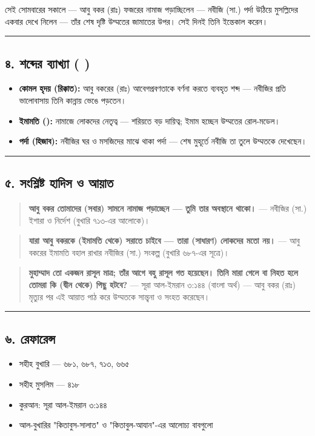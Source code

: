 সেই সোমবারের সকালে — আবু বকর (রাঃ) ফজরের নামাজ পড়াচ্ছিলেন — নবীজি (সা.) পর্দা উঠিয়ে মুসল্লিদের একবার দেখে নিলেন — তাঁর শেষ দৃষ্টি উম্মতের জামাতের উপর। সেই দিনই তিনি ইন্তেকাল করেন।

\medskip\hrule\medskip

\subsection*{৪. শব্দের ব্যাখ্যা ( )}

\begin{itemize}
\item \textbf{কোমল হৃদয় (রিক্কাত):} আবু বকরের (রাঃ) আবেগপ্রবণতাকে বর্ণনা করতে ব্যবহৃত শব্দ — নবীজির প্রতি ভালোবাসায় তিনি কান্নায় ভেঙে পড়তেন।
\item \textbf{ইমামতি ():} নামাজে লোকদের নেতৃত্ব — শরিয়তে বড় দায়িত্ব; ইমাম হচ্ছেন উম্মতের রোল-মডেল।
\item \textbf{পর্দা (হিজাব):} নবীজির ঘর ও মসজিদের মাঝে থাকা পর্দা — শেষ মুহূর্তে নবীজি তা তুলে উম্মতকে দেখেছেন।
\end{itemize}
\medskip\hrule\medskip

\subsection*{৫. সংশ্লিষ্ট হাদিস ও আয়াত}

\begin{quote}
\textbf{আবু বকর তোমাদের (সবার) সামনে নামাজ পড়াচ্ছেন — তুমি তার অবস্থানে থাকো।} — নবীজির (সা.) ইশারা ও নির্দেশ (বুখারি ৭১৩-এর আলোকে)।
\end{quote}

\begin{quote}
\textbf{যারা আবু বকরকে (ইমামতি থেকে) সরাতে চাইবে — তারা (সাধারণ) লোকদের মতো নয়।} — আবু বকরের ইমামতি বহাল রাখার নবীজির (সা.) সংকল্প (বুখারি ৬৮৭-এর সূত্রে)।
\end{quote}

\begin{quote}
\textbf{মুহাম্মাদ তো একজন রাসূল মাত্র; তাঁর আগে বহু রাসূল গত হয়েছেন। তিনি মারা গেলে বা নিহত হলে তোমরা কি (দ্বীন থেকে) পিছু হটবে?} — সূরা আল-ইমরান ৩:১৪৪ (বাংলা অর্থ) — আবু বকর (রাঃ) মৃত্যুর পর এই আয়াত পাঠ করে উম্মতকে সান্ত্বনা ও সংহত করেছেন।
\end{quote}

\medskip\hrule\medskip

\subsection*{৬. রেফারেন্স}

\begin{itemize}
\item সহীহ বুখারি — ৬৮১, ৬৮৭, ৭১৩, ৬৬৫
\item সহীহ মুসলিম — ৪১৮
\item কুরআন: সূরা আল-ইমরান ৩:১৪৪
\item আল-বুখারির "কিতাবুস-সালাত" ও "কিতাবুল-আযান"-এর আলোচ্য বাবগুলো
\end{itemize}


